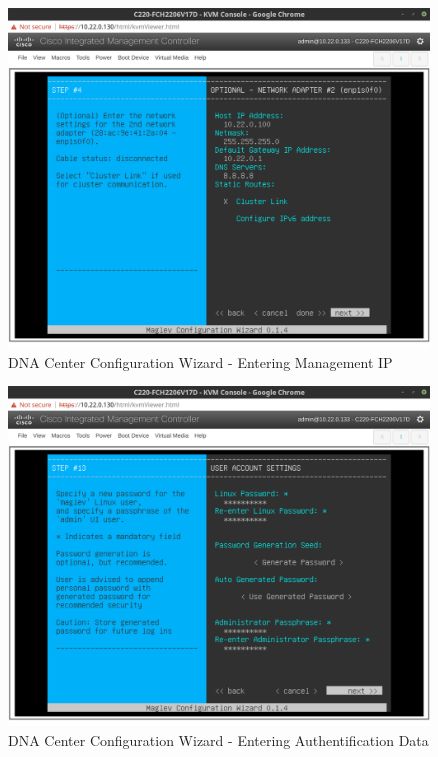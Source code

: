 \begin{figure}[H]
	\centering
	\includegraphics[height=9cm]{img/sc_002.png}
	\caption{DNA Center Configuration Wizard - Entering Management IP}
	\label{fig:dna-center-install-step-4}
\end{figure} 

\begin{figure}[H]
	\centering
	\includegraphics[height=9cm]{img/sc_003.png}
	\caption{DNA Center Configuration Wizard - Entering Authentification Data}
	\label{fig:dna-center-install-step-13}
\end{figure}

